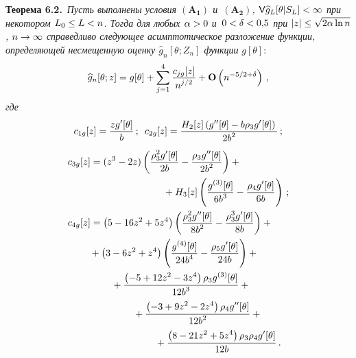 \begin{multicols}{2}
\noindent
\textbf{Теорема 6.2.}\
\textit{Пусть выполнены условия $\mathbf{(A_1)}$ и~$\mathbf{(A_2)}$,
 ${\sf V} \widehat{g}_{L}[\theta|S_L]\hm<\infty$ при некотором $L_0\hm\le L \hm<n$.
 Тогда для любых $\alpha\hm>0$ и~$0\hm<\delta\hm<0{,}5$ при $|z|\hm\le \sqrt{2\alpha\ln n}$, $n\hm\rightarrow\infty$ справедливо следующее асимптотическое разложение
 функции, определяющей несмещенную оценку $\widehat{g}_n[\theta;Z_n]$ функции}
 $g[\theta]$:
  \begin{equation}
\widehat{g}_n[\theta;z]=g[\theta]+
 \sum\limits_{j=1}^4 \displaystyle\frac{\displaystyle c_{jg}[z]\mathstrut}{\displaystyle n^{j/2}\mathstrut}+\mathbf{O}\left(n^{-5/2+\delta}\right)\,,
  \label{T:6.2-1}
 \end{equation}
\textit{где}
$$
  c_{1g}[z]   =\displaystyle\frac{\displaystyle z g'[\theta]\mathstrut}{\displaystyle b\mathstrut}\,;\enskip  c_{2g}[z] =\displaystyle\frac{\displaystyle H_2[z]\left(g''[\theta]-b\rho_3 g'[\theta] \right)\mathstrut}{\displaystyle 2b^2\mathstrut}\,;
  $$
 \begin{align*}
 &c_{3g}[z]   =(z^3-2z)\left(\fr{\rho _3^2 g'[\theta]}{2 b}
    -\fr{\rho_3 g''[\theta]}{2 b^2}  \right)
  +{}\\
  &\hspace*{35mm}{}+H_3[z]\left(\fr{g^{(3)}[\theta]}{6 b^3}-\fr{\rho_4 g'[\theta]}{6 b}\right)\,;
\\
& c_{4g}[z]  =\left(5-16 z^2+5 z^4\right)\left(
 \fr{\rho_3^2 g''[\theta]}{8 b^2}-\fr{ \rho_3^3 g'[\theta]}{8 b}
 \right)+{}
\\
& \hspace*{8mm}{} +\left(3-6 z^2+z^4\right)\left(\fr{g^{(4)}[\theta]}{24 b^4}
 -\fr{ \rho _5 g'[\theta]}{24 b}\right)
 +{}\\
&\hspace*{16mm} {}+\fr{\left(-5+12 z^2-3 z^4\right) \rho_3 g^{(3)}[\theta]}{12
 b^3}+{}\\
 &\hspace*{24mm}{}+
\fr{\left(-3 +9 z^2-2 z^4\right) \rho_4 g''[\theta]}
 {12 b^2}+{}\\
& \hspace*{32mm}{}+  \fr{\left(8-21 z^2+5 z^4\right) \rho_3\rho_4 g'[\theta]}{12 b}\,.
 \end{align*}



\end{multicols}
